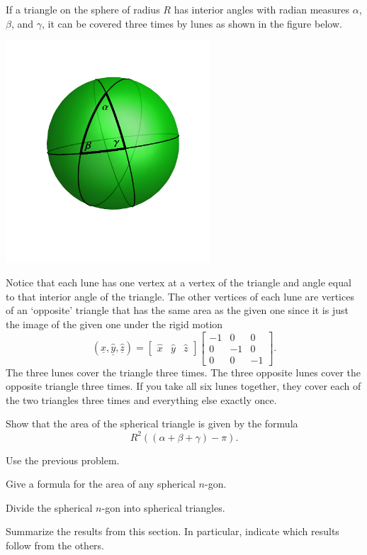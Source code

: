 \documentclass{ximera}
\begin{document}
If a triangle on the sphere of radius $R$ has interior angles with radian
measures $\alpha$, $\beta$, and $\gamma$, it can be covered three times by
lunes as shown in the figure below.%
\begin{image}
\includegraphics[width=3in]{W13_4.png}%
\end{image}
Notice that each lune has one vertex at a vertex of the triangle and angle
equal to that interior angle of the triangle. The other vertices of each lune
are vertices of an `opposite' triangle that has the same area as the given one
since it is just the image of the given one under the rigid motion%
\[
\left(  \underline{\hat{x}},\underline{\hat{y}},\underline{\hat{z}}\right)
=
\begin{bmatrix}
  \hat{x} & \hat{y} &\hat{z}
\end{bmatrix}  
\begin{bmatrix}
-1 & 0 & 0\\
0 & -1 & 0\\
0 & 0 & -1
\end{bmatrix}.
\]
The three lunes cover the triangle three times. The three opposite
lunes cover the opposite triangle three times. If you take all six
lunes together, they cover each of the two triangles three times and
everything else exactly once.

\begin{problem}
Show that the area of the spherical triangle is given by the
formula%
\[
R^{2}\left(  \left(  \alpha+\beta+\gamma\right)  -\pi\right).
\]
\begin{hint}
Use the previous problem.
\end{hint}
\end{problem}


\begin{problem}
Give a formula for the area of any spherical $n$-gon.
\begin{hint}
Divide the spherical $n$-gon into spherical triangles.
\end{hint}
\end{problem}


\begin{problem}
Summarize the results from this section. In particular, indicate which
results follow from the others.
\begin{freeResponse}
\end{freeResponse}
\end{problem}
\end{document}
